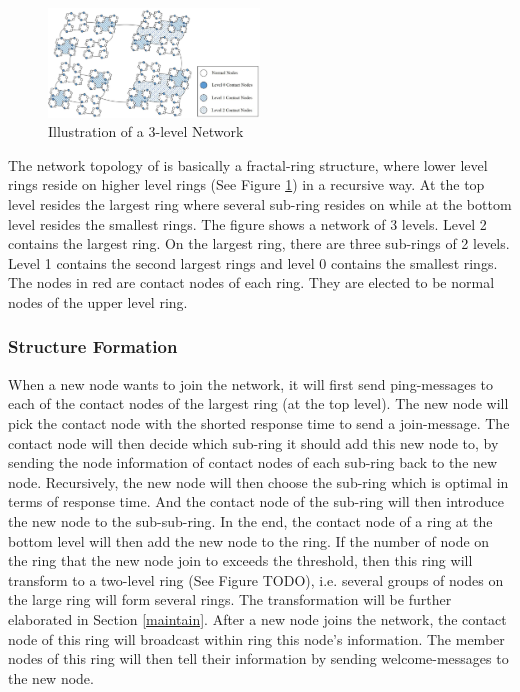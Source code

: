 \begin{figure}[t]
	\includegraphics[width=0.5\textwidth]{figures/topo.jpg}
	\caption{Illustration of a 3-level \xxx Network}
	\label{fig:topo}
\end{figure}

The network topology of \xxx is basically a fractal-ring structure, where lower level rings reside on higher level rings (See Figure \ref{fig:topo}) in a recursive way. At the top level resides the largest ring where several sub-ring resides on while at the bottom level resides the smallest rings. The figure shows a network of 3 levels. Level 2 contains the largest ring. On the largest ring, there are three sub-rings of 2 levels. Level 1 contains the second largest rings and level 0 contains the smallest rings. The nodes in red are contact nodes of each ring. They are elected to be normal nodes of the upper level ring.

\subsubsection{Structure Formation} \label{formation}

When a new node wants to join the network, it will first send ping-messages to each of the contact nodes of the largest ring (at the top level). The new node will pick the contact node with the shorted response time to send a join-message. The contact node will then decide which sub-ring it should add this new node to, by sending the node information of contact nodes of each sub-ring back to the new node. Recursively, the new node will then choose the sub-ring which is optimal in terms of response time. And the contact node of the sub-ring will then introduce the new node to the sub-sub-ring. In the end, the contact node of a ring at the bottom level will then add the new node to the ring. If the number of node on the ring that the new node join to exceeds the threshold, then this ring will transform to a two-level ring (See Figure TODO), i.e. several groups of nodes on the large ring will form several rings. The transformation will be further elaborated in Section \cref{maintain}. After a new node joins the network, the contact node of this ring will broadcast within ring this node's information. The member nodes of this ring will then tell their information by sending welcome-messages to the new node.

